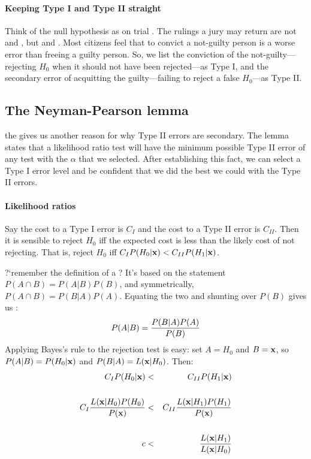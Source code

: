 \paragraph{Keeping Type I and Type II straight} 
 

Think of the null hypothesis as on
trial \citep[pp 112--113]{kmenta}.  The rulings a jury may return are
not  and , but  and . Most citizens feel that to convict a not-guilty person is a worse
error than freeing a guilty person. So, we list the conviction of the
not-guilty---rejecting $H_0$ when it should not have been rejected---as
Type I, and the secondary error of acquitting the guilty---failing to
reject a false $H_0$---as Type II.


\subsection{The Neyman-Pearson lemma} the 
gives us another reason for why Type II errors are secondary.
The lemma states that a likelihood ratio test will have
the minimum possible Type II error of any test with the $\alpha$ that
we selected. After establishing this fact, we can select a Type I error level and be confident that we did the best we could with the Type II errors.

\paragraph{Likelihood ratios} 

Say the cost to a Type I error is $C_I$ and the cost to a Type II error
is $C_{II}$.  Then it is sensible to reject $H_0$ iff the expected cost is less
than the likely cost of not rejecting. That is, reject $H_0$ iff $C_I
P(H_0|{\bf x})<C_{II} P(H_1|{\bf x})$.

?`remember the definition of a ? It's based on the
statement $P(A\cap B)=P(A|B)P(B)$, and symmetrically, $P(A\cap B)=P(B|A)P(A)$.  Equating
the two and shunting over $P(B)$ gives us : $$P(A|B)={P(B|A) P(A)\over P(B)}$$
Applying Bayes's rule to the rejection test is easy: set $A=H_0$ and $B={\bf x}$,
so $P(A|B)=P(H_0|{\bf x})$ and $P(B|A)=L({\bf x}|H_0)$. Then:
\begin{eqnarray}
C_I P(H_0|{\bf x})&<&C_{II} P(H_1|{\bf x})\label{firstnp}\\
\nonumber\\
C_I {L({\bf x}|H_0)P(H_0)\over P({\bf x})}&<& C_{II} {L({\bf x}|H_1)P(H_1)\over P({\bf x})}\label{secondnp}\\
\nonumber\\
c&<& {L({\bf x}|H_1)\over L({\bf x}|H_0)}\label{thirdnp}
\end{eqnarray}

